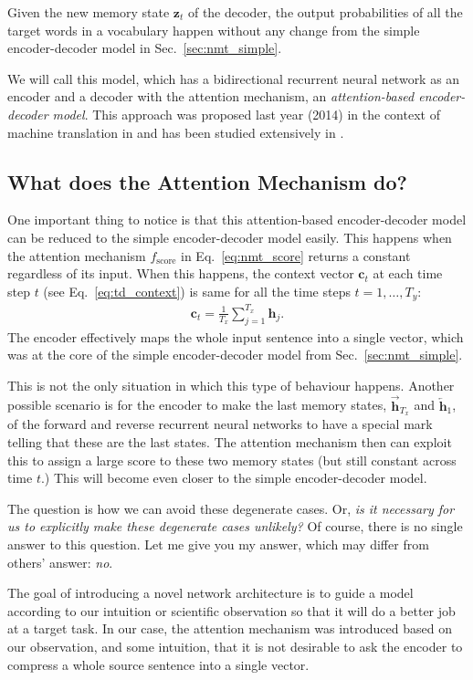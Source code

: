 \documentclass{report}
\newcommand{\vect}[1]{\mathbf{#1}}
\newcommand{\vc}[0]{\vect{c}}
\newcommand{\vh}[0]{\vect{h}}
\newcommand{\vz}[0]{\vect{z}}
\begin{document}
Given the new memory state $\vz_t$ of the decoder, the output probabilities of
all the target words in a vocabulary happen without any change from the simple
encoder-decoder model in Sec.~\ref{sec:nmt_simple}.

We will call this model, which has a bidirectional recurrent neural network as
an encoder and a decoder with the attention mechanism, an {\em attention-based
encoder-decoder model}. This approach was proposed last year (2014) in the
context of machine translation in \citet{bahdanau2014neural} and has been studied
extensively in \citet{luong2015effective}.


\subsection{What does the Attention Mechanism do?}

One important thing to notice is that this attention-based encoder-decoder model
can be reduced to the simple encoder-decoder model easily. This happens when the
attention mechanism $f_{\text{score}}$ in Eq.~\eqref{eq:nmt_score} returns a
constant regardless of its input. When this happens, the context vector $\vc_t$
at each time step $t$ (see Eq.~\eqref{eq:td_context}) is same for all the time
steps $t=1,\ldots,T_y$:
\begin{align*}
    \vc_t = \frac{1}{T_x} \sum_{j=1}^{T_x} \vh_j.
\end{align*}
The encoder effectively maps the whole input sentence into a single vector,
which was at the core of the simple encoder-decoder model from
Sec.~\ref{sec:nmt_simple}. 

This is not the only situation in which this type of behaviour happens. Another
possible scenario is for the encoder to make the last memory states,
$\overrightarrow{\vh}_{T_x}$ and $\overleftarrow{\vh}_1$, of the forward and
reverse recurrent neural networks to have a special mark telling that these are
the last states. The attention mechanism then can exploit this to assign a large
score to these two memory states (but still constant across time $t$.) This will
become even closer to the simple encoder-decoder model.

The question is how we can avoid these degenerate cases. Or, {\em is it
necessary for us to explicitly make these degenerate cases unlikely?} Of course,
there is no single answer to this question. Let me give you my answer, which may
differ from others' answer: {\em no}.

The goal of introducing a novel network architecture is to guide a model
according to our intuition or scientific observation so that it will do a better
job at a target task. In our case, the attention mechanism was introduced based
on our observation, and some intuition, that it is not desirable to ask the
encoder to compress a whole source sentence into a single vector. 
\end{document}
